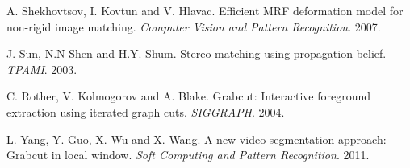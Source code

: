 \documentclass[a4paper, 10pt, conference]{ieeeconf}      %
\begin{document}
\begin{thebibliography}{99}
A. Shekhovtsov, I. Kovtun and V. Hlavac. Efficient MRF deformation model for non-rigid image matching. {\it Computer Vision and Pattern Recognition}. 2007.

J. Sun, N.N Shen and H.Y. Shum. Stereo matching using propagation belief. {\it TPAMI}. 2003.

C. Rother, V. Kolmogorov and A. Blake. Grabcut: Interactive foreground extraction using iterated graph cuts. {\it SIGGRAPH}. 2004.

L. Yang, Y. Guo, X. Wu and X. Wang. A new video segmentation approach: Grabcut in local window. {\it Soft Computing and Pattern Recognition}. 2011.

\end{thebibliography}
\end{document}
